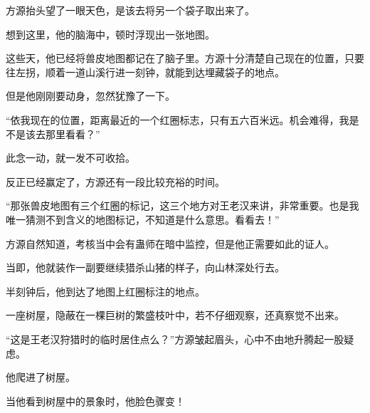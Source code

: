 \begin{this_body}
方源抬头望了一眼天色，是该去将另一个袋子取出来了。

想到这里，他的脑海中，顿时浮现出一张地图。

这些天，他已经将兽皮地图都记在了脑子里。方源十分清楚自己现在的位置，只要往左拐，顺着一道山溪行进一刻钟，就能到达埋藏袋子的地点。

但是他刚刚要动身，忽然犹豫了一下。

“依我现在的位置，距离最近的一个红圈标志，只有五六百米远。机会难得，我是不是该去那里看看？”

此念一动，就一发不可收拾。

反正已经赢定了，方源还有一段比较充裕的时间。

“那张兽皮地图有三个红圈的标记，这三个地方对王老汉来讲，非常重要。也是我唯一猜测不到含义的地图标记，不知道是什么意思。看看去！”

方源自然知道，考核当中会有蛊师在暗中监控，但是他正需要如此的证人。

当即，他就装作一副要继续猎杀山猪的样子，向山林深处行去。

半刻钟后，他到达了地图上红圈标注的地点。

一座树屋，隐蔽在一棵巨树的繁盛枝叶中，若不仔细观察，还真察觉不出来。

“这是王老汉狩猎时的临时居住点么？”方源皱起眉头，心中不由地升腾起一股疑虑。

他爬进了树屋。

当他看到树屋中的景象时，他脸色骤变！

\end{this_body}

